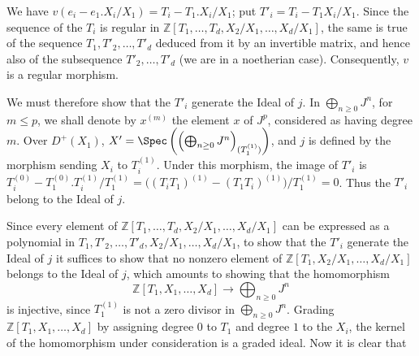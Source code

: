 We have \(v(e_i-e_1.X_i/X_1)=T_i-T_1.X_i/X_1\); put \(T'_i=T_i-T_1X_i/X_1\).
Since the sequence of the \(T_i\) is regular in \(\mathbb Z[T_1,\ldots,T_d,X_2/X_1,\ldots,X_d/X_1]\), the same is true of the sequence \(T_1,T'_2,\ldots,T'_d\) deduced from it by an invertible matrix, and hence also of the subsequence \(T'_2,\ldots,T'_d\) (we are in a noetherian case). Consequently, \(v\) is a regular morphism.

We must therefore show that the \(T'_i\) generate the Ideal of \(j\). In \(\bigoplus_{n\ge0}J^n\), for \(m\le p\), we shall denote by \(x^{(m)}\) the element \(x\) of \(J^p\), considered as having degree \(m\). Over \(D^+(X_1)\), \(X'=\Spec\left(\left(\bigoplus_{n\ge0}J^n\right)_{(T_1^{(1)})}\right)\), and \(j\) is defined by the morphism sending \(X_i\) to \(T_i^{(1)}\). Under this morphism, the image of \(T'_i\) is \(T_i^{(0)}-T_1^{(0)}.T_i^{(1)}/T_1^{(1)}=\bigl((T_iT_1)^{(1)}-(T_1T_i)^{(1)}\bigr)/T_1^{(1)}=0\). Thus the \(T'_i\) belong to the Ideal of \(j\).

Since every element of \(\mathbb Z[T_1,\ldots,T_d,X_2/X_1,\ldots,X_d/X_1]\) can be expressed as a polynomial in \(T_1,T'_2,\ldots,T'_d,X_2/X_1,\ldots,X_d/X_1\), to show that the \(T'_i\) generate the Ideal of \(j\) it suffices to show that no nonzero element of \(\mathbb Z[T_1,X_2/X_1,\ldots,X_d/X_1]\) belongs to the Ideal of \(j\), which amounts to showing that the homomorphism
\[
\mathbb Z[T_1,X_1,\ldots,X_d]\longrightarrow\bigoplus_{n\ge0}J^n
\]
is injective, since \(T_1^{(1)}\) is not a zero divisor in \(\bigoplus_{n\ge0}J^n\). Grading \(\mathbb Z[T_1,X_1,\ldots,X_d]\) by assigning degree \(0\) to \(T_1\) and degree \(1\) to the \(X_i\), the kernel of the homomorphism under consideration is a graded ideal. Now it is clear that
